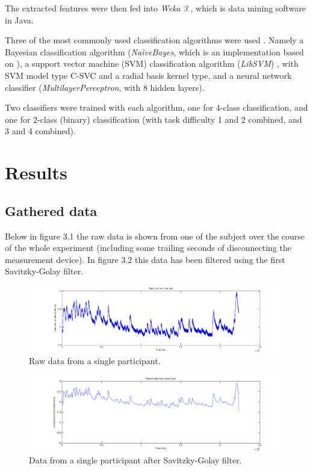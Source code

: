 \documentclass[11pt,leqno,a4paper]{report} %
\begin{document}
The extracted features were then fed into \emph{Weka 3} \citep{weka}, which is data mining software in Java. 


Three of the most commonly used classification algorithms were used \citep{small}. Namely a Bayesian classification algorithm (\emph{Na\"iveBayes}, which is an implementation based on \citep{john1995estimating}), a support vector machine (SVM) classification algorithm (\emph{LibSVM}) \citep{libsvm}, with SVM model type C-SVC and a radial basis kernel type, and a neural network classifier (\emph{MultilayerPerceptron}, with 8 hidden layers). 

Two classifiers  were trained with each algorithm, one for 4-class classification, and one for 2-class (binary) classification (with task difficulty 1 and 2 combined, and 3 and 4 combined).


\chapter{Results}

\section{Gathered data}

Below in figure 3.1 the raw data is shown from one of the subject over the course of the whole experiment (including some trailing seconds of disconnecting the measurement device). In figure 3.2 this data has been filtered using the first Savitzky-Golay filter.


\begin{figure}[H]
  \centering
    \hspace*{-.25\textwidth}   
    \includegraphics[width=1.5\textwidth]{measurements/raw.png}
  \caption{Raw data from a single participant.}
\end{figure}

\begin{figure}[H]
  \centering
 	\hspace*{-.25\textwidth}   
 	\includegraphics[width=1.5\textwidth]{measurements/filtered.png}
  \caption{Data from a single participant after Savitzky-Golay filter.}
\end{figure}
\end{document}
